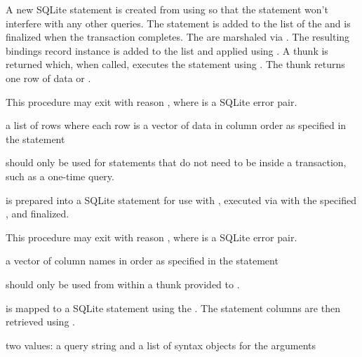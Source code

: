 A new SQLite statement is created from  using
 so that the statement won't interfere with
any other queries. The statement is added to the
 list of the  and is
finalized when the transaction completes.  The  are marshaled
via . The resulting bindings record instance
is added to the  list and applied
using . A thunk is returned which, when
called, executes the statement using . The thunk
returns one row of data or .

This procedure may exit with reason , where  is a SQLite error pair.

\begin{procedure}
\end{procedure}
\returns{}
a list of rows where each row is a vector of data in column order as
specified in the  statement

 should only be used for statements that do not need to be inside a transaction, such as a one-time query.

 is prepared into a SQLite statement for use with , executed via  with the specified , and finalized.

This procedure may exit with reason , where  is a SQLite error pair.

\begin{procedure}
\end{procedure}
\returns{}
a vector of column names in order as specified in the  statement

 should only be used from within a thunk 
provided to .

 is mapped to a SQLite statement using the
. The statement columns are then retrieved
using .

\begin{procedure}\end{procedure}
\returns{} two values: a query string and a list of syntax objects for
the arguments

